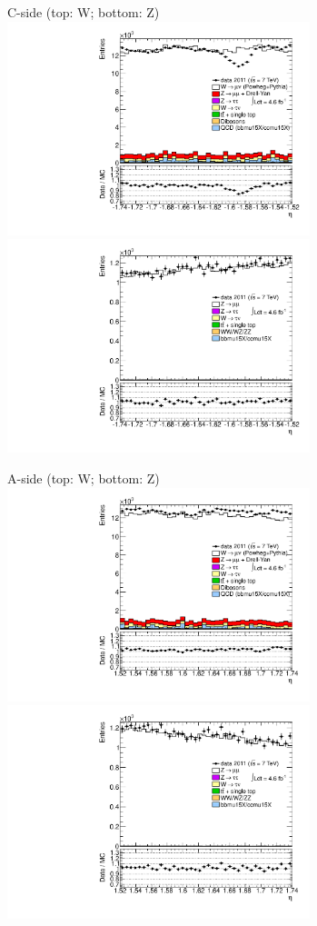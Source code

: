 {

\colb[T]

C-side (top: W; bottom: Z)
\centering
\includegraphics[width=0.66\textwidth]{dates/20130306/figures/etaphi/W_8_C_stack_l_eta_POS} \\
\includegraphics[width=0.66\textwidth]{dates/20130306/figures/etaphi/Z_8_C_stack_lP_eta_ALL.pdf}

A-side (top: W; bottom: Z)
\centering
\includegraphics[width=0.66\textwidth]{dates/20130306/figures/etaphi/W_8_A_stack_l_eta_POS} \\
\includegraphics[width=0.66\textwidth]{dates/20130306/figures/etaphi/Z_8_A_stack_lP_eta_ALL.pdf} 

\cole
}


